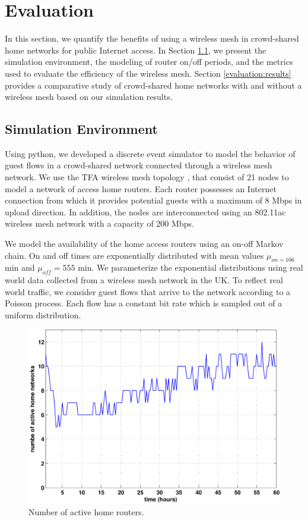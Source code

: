 \section{Evaluation}
\label{sec:evaluation}

In this section, we quantify the benefits of using a wireless mesh in crowd-shared home networks for public Internet access. In Section \ref{evaluation:environment}, we present the simulation environment, the modeling of router on/off periods, and the metrics used to evaluate the efficiency of the wireless mesh. Section \ref{evaluation:results} provides a comparative study of crowd-shared home networks with and without a wireless mesh based on our simulation results.

\subsection{Simulation Environment}
\label{evaluation:environment}

Using python, we developed a discrete event simulator to model the behavior of guest flows in a crowd-shared network connected through a wireless mesh network. We use the TFA wireless mesh topology \cite{}, that consist of 21 nodes to model a network of access home routers. Each router possesses an Internet connection from which it provides potential guests with a maximum of 8 Mbps in upload direction. In addition, the nodes are interconnected using an 802.11ac wireless mesh network with a capacity of 200 Mbps.

We model the availability of the home access routers using an on-off Markov chain. On and off times are exponentially distributed with mean values $\mu_{on = 106}$ min and $\mu_{off} = 555$ min. We parameterize the exponential distributions using real world data collected from a wireless mesh network in the UK.  To reflect real world traffic, we consider guest flows that arrive to the network according to a Poisson process. Each flow has a constant bit rate which is sampled out of a uniform distribution.

\begin{figure}[t]
\begin{center}
\includegraphics[width=1\linewidth]{results/on_routers.pdf}
\caption{Number of active home routers.}
\label{fig:active_routers}
\end{center}
\end{figure}

